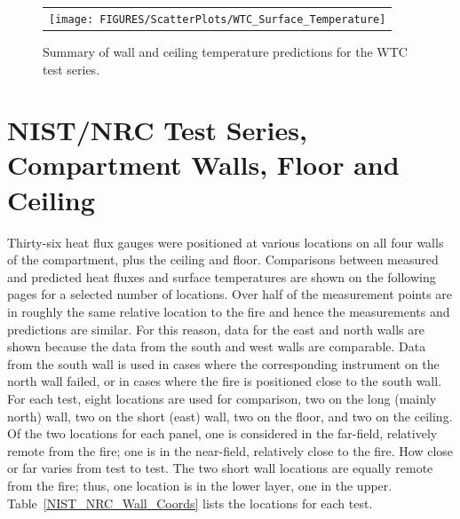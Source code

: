 \begin{figure}[p]
\begin{center}
\begin{tabular}{c}
\texttt{[image: FIGURES/ScatterPlots/WTC\_Surface\_Temperature]}
\end{tabular}
\end{center}
\caption[Summary of wall and ceiling temperature predictions, WTC test series.]
{Summary of wall and ceiling temperature predictions for the WTC test series.}
\end{figure}


\clearpage





\section{NIST/NRC Test Series, Compartment Walls, Floor and Ceiling}

Thirty-six heat flux gauges were positioned at various locations on all four walls of the compartment,
plus the ceiling and floor.  Comparisons between measured and predicted heat fluxes and surface temperatures are shown
on the following pages for a selected number of locations.
Over half of the measurement points are in roughly the same relative location to the fire and hence
the measurements and predictions are similar.  For this reason, data for the east and north walls are shown
because the data from the south and west walls are comparable.  Data from the south wall is used in cases where
the corresponding instrument on the north wall failed, or in cases where the fire is positioned close to the south wall.
For each test, eight locations are used for comparison, two on the long (mainly north) wall,
two on the short (east) wall, two on the floor, and two on the ceiling.  Of the two locations for each panel,
one is considered in the far-field, relatively remote from the fire; one is in the near-field,
relatively close to the fire.  How close or far varies from test to test.
The two short wall locations are equally remote from the fire; thus, one location is in the lower layer, one in the upper.
Table~\ref{NIST_NRC_Wall_Coords} lists the locations for each test.


\vspace{\baselineskip}

